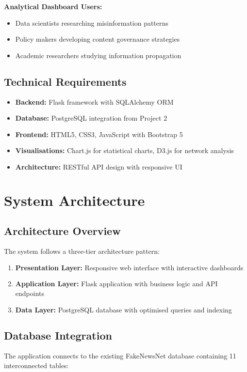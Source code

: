 \documentclass[12pt,a4paper]{article}
\begin{document}
\textbf{Analytical Dashboard Users:}
\begin{itemize}
    \item Data scientists researching misinformation patterns
    \item Policy makers developing content governance strategies
    \item Academic researchers studying information propagation
\end{itemize}

\subsection{Technical Requirements}
\begin{itemize}
    \item \textbf{Backend:} Flask framework with SQLAlchemy ORM
    \item \textbf{Database:} PostgreSQL integration from Project 2
    \item \textbf{Frontend:} HTML5, CSS3, JavaScript with Bootstrap 5
    \item \textbf{Visualisations:} Chart.js for statistical charts, D3.js for network analysis
    \item \textbf{Architecture:} RESTful API design with responsive UI
\end{itemize}

\section{System Architecture}

\subsection{Architecture Overview}
The system follows a three-tier architecture pattern:

\begin{enumerate}
    \item \textbf{Presentation Layer:} Responsive web interface with interactive dashboards
    \item \textbf{Application Layer:} Flask application with business logic and API endpoints
    \item \textbf{Data Layer:} PostgreSQL database with optimised queries and indexing
\end{enumerate}

\subsection{Database Integration}
The application connects to the existing FakeNewsNet database containing 11 interconnected tables:
\end{document}
